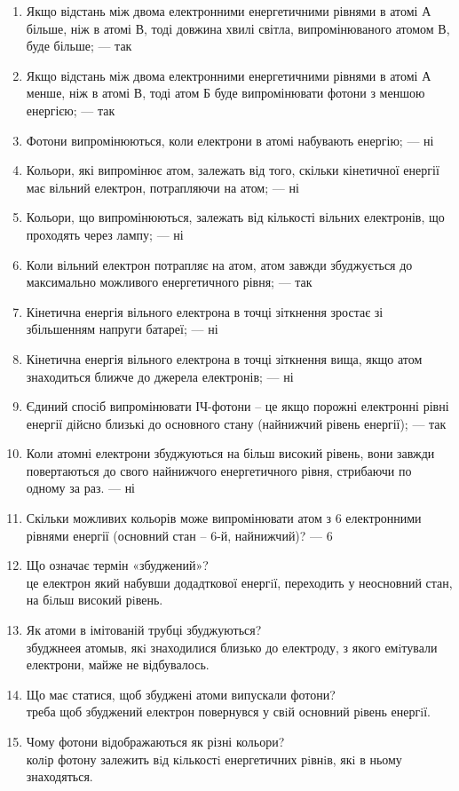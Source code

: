 \documentclass[a4paper,14pt]{extreport}
\begin{document}
\clearpage
\newpage
\begin{enumerate}
	\item Якщо відстань між двома електронними енергетичними рівнями в атомі 
	А більше, ніж в атомі В, тоді довжина хвилі світла, випромінюваного 
	атомом В, буде більше; --- так
	\item Якщо відстань між двома електронними енергетичними рівнями в атомі 
	А менше, ніж в атомі В, тоді атом Б буде випромінювати фотони з 
	меншою енергією; ---  так
	\item Фотони випромінюються, коли електрони в атомі набувають енергію; --- ні
	\item Кольори, які випромінює атом, залежать від того, скільки кінетичної 
	енергії має вільний електрон, потрапляючи на атом;
	--- ні
	\item Кольори, що випромінюються, залежать від кількості вільних 
	електронів, що проходять через лампу;
	--- ні
	\item Коли вільний електрон потрапляє на атом, атом завжди збуджується до 
	максимально можливого енергетичного рівня;
	--- так
	\item Кінетична енергія вільного електрона в точці зіткнення зростає зі 
	збільшенням напруги батареї;
	--- ні
	\item Кінетична енергія вільного електрона в точці зіткнення вища, якщо атом 
	знаходиться ближче до джерела електронів;
	--- ні
	\item Єдиний спосіб випромінювати ІЧ-фотони – це якщо порожні електронні 
	рівні енергії дійсно близькі до основного стану (найнижчий рівень 
	енергії);
	--- так
	\item Коли атомні електрони збуджуються на більш високий рівень, вони 
	завжди повертаються до свого найнижчого енергетичного рівня, 
	стрибаючи по одному за раз.
	--- ні
	\item Скільки можливих кольорів може випромінювати атом з 6 
	електронними рівнями енергії (основний стан – 6-й, найнижчий)?
	--- 6
	\item Що означає термін «збуджений»?\\
	це електрон який набувши додадткової
		енергiї, переходить у неосновний стан, на бiльш високий рiвень.
	\item Як атоми в імітованій трубці збуджуються?\\
	збуджнеея атомыв, якi знаходилися близько до електроду, з якого емiтували	електрони, майже не відбувалось.
	\item Що має статися, щоб збуджені атоми випускали фотони?\\
	треба щоб збуджений електрон повернувся у свiй основний рiвень енергiї.
	\item Чому фотони відображаються як різні кольори?\\
	колiр фотону залежить вiд кiлькостi енергетичних рiвнiв, якi в ньому знаходяться.
\end{enumerate}
\end{document}
